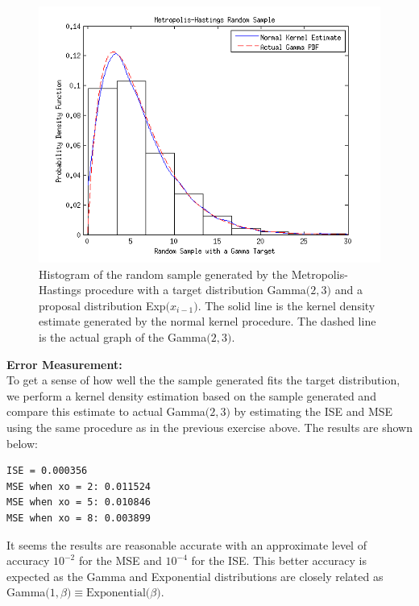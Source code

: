 \documentclass[12pt,a4paper]{article}
\begin{document}
\begin{figure}[ht!] 
\begin{center}
\includegraphics[scale=1]{inclass_graph3.png}
\caption{Histogram of the random sample generated by the Metropolis-Hastings procedure with a target distribution Gamma$\bigr(2,3\bigr)$ and a proposal distribution Exp$\bigr(x_{i-1}\bigr)$. The solid line is the kernel density estimate generated by the normal kernel procedure. The dashed line is the actual graph of the Gamma$\bigr(2,3\bigr)$.}
\label{inclass fig3}
\end{center}
\end{figure}
\FloatBarrier
\textbf{Error Measurement:}\\
To get a sense of how well the the sample generated fits the target distribution, we perform a kernel density estimation based on the sample generated and compare this estimate to actual Gamma$\bigr(2,3\bigr)$ by estimating the ISE and MSE using the same procedure as in the previous exercise above. The results are shown below:
\begin{verbatim}
ISE = 0.000356
MSE when xo = 2: 0.011524
MSE when xo = 5: 0.010846
MSE when xo = 8: 0.003899
\end{verbatim}
It seems the results are reasonable accurate with an approximate level of accuracy $10^{-2}$ for the MSE and $10^{-4}$ for the ISE. This better accuracy is expected as the Gamma and Exponential distributions are closely related as Gamma$\bigr(1,\beta\bigr)\equiv\text{Exponential}\bigr(\beta\bigr)$.
\end{document}
